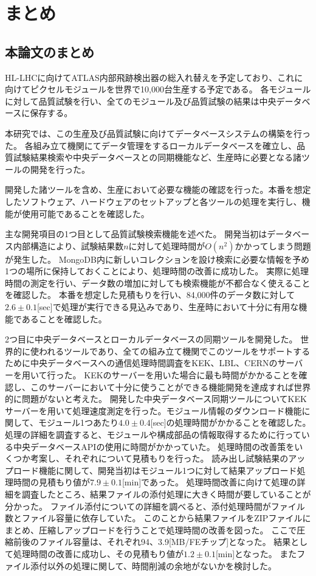 \chapter{まとめ}

\section{本論文のまとめ}
HL-LHCに向けてATLAS内部飛跡検出器の総入れ替えを予定しており、これに向けてピクセルモジュールを世界で10,000台生産する予定である。
各モジュールに対して品質試験を行い、全てのモジュール及び品質試験の結果は中央データベースに保存する。

本研究では、この生産及び品質試験に向けてデータベースシステムの構築を行った。
各組み立て機関にてデータ管理をするローカルデータベースを確立し、品質試験結果検索や中央データベースとの同期機能など、生産時に必要となる諸ツールの開発を行った。

開発した諸ツールを含め、生産において必要な機能の確認を行った。本番を想定したソフトウェア、ハードウェアのセットアップと各ツールの処理を実行し、機能が使用可能であることを確認した。

主な開発項目の1つ目として品質試験検索機能を述べた。
開発当初はデータベース内部構造により、試験結果数$n$に対して処理時間が$O(n^2)$かかってしまう問題が発生した。
MongoDB内に新しいコレクションを設け検索に必要な情報を予め1つの場所に保持しておくことにより、処理時間の改善に成功した。
実際に処理時間の測定を行い、データ数の増加に対しても検索機能が不都合なく使えることを確認した。
本番を想定した見積もりを行い、84,000件のデータ数に対して$2.6\pm0.1$[sec]で処理が実行できる見込みであり、生産時において十分に有用な機能であることを確認した。

2つ目に中央データベースとローカルデータベースの同期ツールを開発した。
世界的に使われるツールであり、全ての組み立て機関でこのツールをサポートするために中央データベースへの通信処理時間調査をKEK、LBL、CERNのサーバーを用いて行った。
KEKのサーバーを用いた場合に最も時間がかかることを確認し、このサーバーにおいて十分に使うことができる機能開発を達成すれば世界的に問題がないと考えた。
開発した中央データベース同期ツールについてKEKサーバーを用いて処理速度測定を行った。モジュール情報のダウンロード機能に関して、モジュール1つあたり$4.0\pm 0.4$[sec]の処理時間がかかることを確認した。
処理の詳細を調査すると、モジュールや構成部品の情報取得するために行っている中央データベースAPIの使用に時間がかかっていた。
処理時間の改善策をいくつか考案し、それぞれについて見積もりを行った。
読み出し試験結果のアップロード機能に関して、開発当初はモジュール1つに対して結果アップロード処理時間の見積もり値が$7.9 ± 0.1$[min]であった。
処理時間改善に向けて処理の詳細を調査したところ、結果ファイルの添付処理に大きく時間が要していることが分かった。
ファイル添付についての詳細を調べると、添付処理時間がファイル数とファイル容量に依存していた。
このことから結果ファイルをZIPファイルにまとめ、圧縮しアップロードを行うことで処理時間の改善を図った。
ここで圧縮前後のファイル容量は、それぞれ94、3.9[MB/FEチップ]となった。
結果として処理時間の改善に成功し、その見積もり値が$1.2\pm 0.1$[min]となった。
またファイル添付以外の処理に関して、時間削減の余地がないかを検討した。

